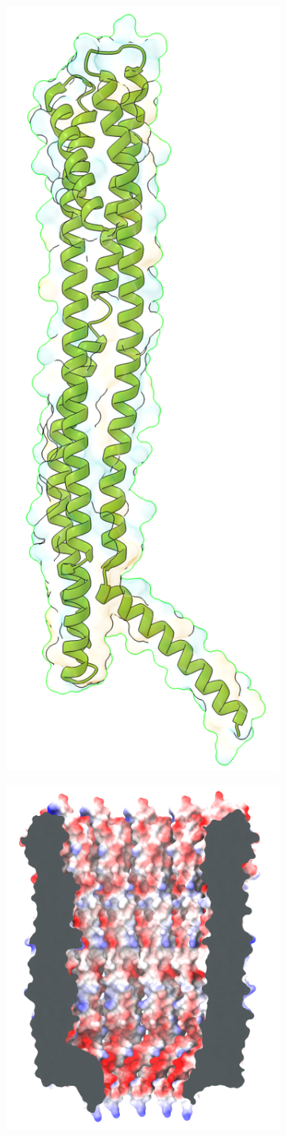 \begin{figure}[ht!]
\begin{centering}
  \begin{subfigure}[t]{\dimexpr.35\linewidth-1.3em\relax}
  \centering
  \includegraphics[width=.35\linewidth,valign=t]{Figures/clya-mon-c.png}
  \end{subfigure}%
  \begin{subfigure}[t]{\dimexpr.3\linewidth-1.3em\relax}
  \centering
  \includegraphics[width=\linewidth,valign=t]{Figures/clya-elec.png}

\end{subfigure}
\end{centering}
\end{figure}
